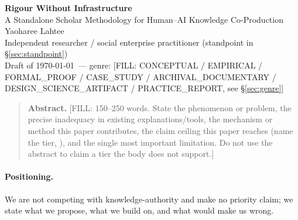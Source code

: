 \documentclass[10pt,twocolumn]{article}
\begin{document}
\onecolumn
\begin{center}
  {\LARGE\bfseries Rigour Without Infrastructure}\\[0.4em]
  {\large A Standalone Scholar Methodology for Human--AI Knowledge Co-Production}\\[0.9em]
  {\normalsize Yaoharee Lahtee}\\[0.15em]
  {\small Independent researcher / social enterprise practitioner (standpoint in \S\ref{sec:standpoint})}\\[0.6em]
  {\small Draft of \today\ --- genre: [FILL: CONCEPTUAL / EMPIRICAL / FORMAL\_PROOF /
  CASE\_STUDY / ARCHIVAL\_DOCUMENTARY / DESIGN\_SCIENCE\_ARTIFACT / PRACTICE\_REPORT,
  see \S\ref{sec:genre}]}
\end{center}
\vspace{0.6em}
\begin{quote}
\small\noindent\textbf{Abstract.} [FILL: 150--250 words. State the phenomenon or
problem, the precise inadequacy in existing explanations/tools, the mechanism
or method this paper contributes, the claim ceiling this paper reaches (name
the tier, ), and the single most important limitation. Do not
use the abstract to claim a tier the body does not support.]
\end{quote}
\twocolumn

\paragraph{Positioning.} We are not competing with knowledge-authority and make
no priority claim; we state what we propose, what we build on, and what would
make us wrong.
\end{document}

